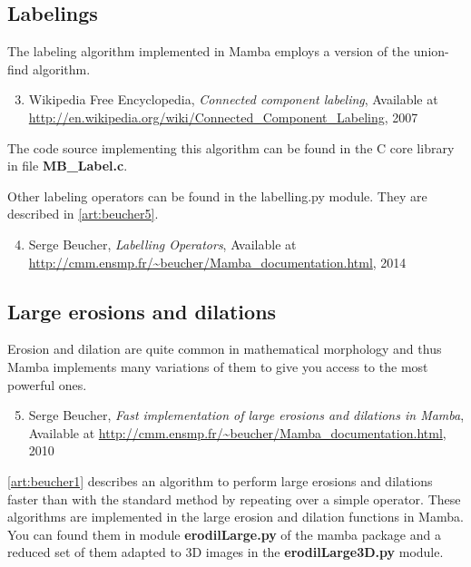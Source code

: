 \documentclass[a4paper,10pt,oneside]{article}
\begin{document}
\subsection{Labelings}

The labeling algorithm implemented in Mamba employs a version of the union-find 
algorithm.

\begin{enumerate}
\setcounter{enumi}{2}
\item \label{art:wikipedia} Wikipedia Free Encyclopedia, 
\emph{Connected component labeling},
Available at \url{http://en.wikipedia.org/wiki/Connected\_Component\_Labeling}, 2007
\end{enumerate}

The code source implementing this algorithm can be found in the C core library
in file \textbf{MB\_Label.c}.

Other labeling operators can be found in the labelling.py module. They are described in \ref{art:beucher5}.

\begin{enumerate}
\setcounter{enumi}{3}
\item \label{art:beucher5} Serge Beucher,
\emph{Labelling Operators},
Available at \url{http://cmm.ensmp.fr/\~beucher/Mamba\_documentation.html}, 2014
\end{enumerate}

\subsection{Large erosions and dilations}
\label{cha:opt_ero_dil}

Erosion and dilation are quite common in mathematical morphology and thus Mamba
implements many variations of them to give you access to the most powerful ones.

\begin{enumerate}
\setcounter{enumi}{4}
\item \label{art:beucher1} Serge Beucher,
\emph{Fast implementation of large erosions and dilations in Mamba},
Available at \url{http://cmm.ensmp.fr/\~beucher/Mamba\_documentation.html}, 2010
\end{enumerate}

\ref{art:beucher1} describes an algorithm to perform large erosions and
dilations faster than with the standard method by repeating over a simple
operator. These algorithms are implemented in the large erosion and dilation
functions in Mamba. You can found them in module \textbf{erodilLarge.py} of
the mamba package and a reduced set of them adapted to 3D images in the
\textbf{erodilLarge3D.py} module.
\end{document}
